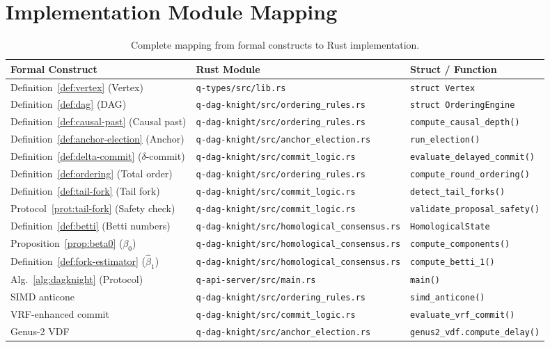 \documentclass[11pt,a4paper]{article}
\theoremstyle{definition}
\theoremstyle{remark}
\begin{document}
\section{Implementation Module Mapping}\label{app:mapping}

\begin{table}[H]
\centering
\caption{Complete mapping from formal constructs to Rust implementation.}
\label{tab:full-mapping}
\begin{tabular}{@{}p{4cm}p{5cm}p{4cm}@{}}
\toprule
\textbf{Formal Construct} & \textbf{Rust Module} & \textbf{Struct / Function} \\
\midrule
Definition~\ref{def:vertex} (Vertex)
  & \texttt{q-types/src/lib.rs}
  & \texttt{struct Vertex} \\
Definition~\ref{def:dag} (DAG)
  & \texttt{q-dag-knight/src/ordering\_rules.rs}
  & \texttt{struct OrderingEngine} \\
Definition~\ref{def:causal-past} (Causal past)
  & \texttt{q-dag-knight/src/ordering\_rules.rs}
  & \texttt{compute\_causal\_depth()} \\
Definition~\ref{def:anchor-election} (Anchor)
  & \texttt{q-dag-knight/src/anchor\_election.rs}
  & \texttt{run\_election()} \\
Definition~\ref{def:delta-commit} ($\delta$-commit)
  & \texttt{q-dag-knight/src/commit\_logic.rs}
  & \texttt{evaluate\_delayed\_commit()} \\
Definition~\ref{def:ordering} (Total order)
  & \texttt{q-dag-knight/src/ordering\_rules.rs}
  & \texttt{compute\_round\_ordering()} \\
Definition~\ref{def:tail-fork} (Tail fork)
  & \texttt{q-dag-knight/src/commit\_logic.rs}
  & \texttt{detect\_tail\_forks()} \\
Protocol~\ref{prot:tail-fork} (Safety check)
  & \texttt{q-dag-knight/src/commit\_logic.rs}
  & \texttt{validate\_proposal\_safety()} \\
Definition~\ref{def:betti} (Betti numbers)
  & \texttt{q-dag-knight/src/homological\_consensus.rs}
  & \texttt{HomologicalState} \\
Proposition~\ref{prop:beta0} ($\beta_0$)
  & \texttt{q-dag-knight/src/homological\_consensus.rs}
  & \texttt{compute\_components()} \\
Definition~\ref{def:fork-estimator} ($\hat{\beta}_1$)
  & \texttt{q-dag-knight/src/homological\_consensus.rs}
  & \texttt{compute\_betti\_1()} \\
Alg.~\ref{alg:dagknight} (Protocol)
  & \texttt{q-api-server/src/main.rs}
  & \texttt{main()} \\
SIMD anticone
  & \texttt{q-dag-knight/src/ordering\_rules.rs}
  & \texttt{simd\_anticone()} \\
VRF-enhanced commit
  & \texttt{q-dag-knight/src/commit\_logic.rs}
  & \texttt{evaluate\_vrf\_commit()} \\
Genus-2 VDF
  & \texttt{q-dag-knight/src/anchor\_election.rs}
  & \texttt{genus2\_vdf.compute\_delay()} \\
\bottomrule
\end{tabular}
\end{table}
\end{document}
